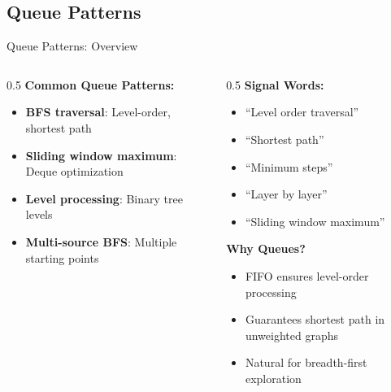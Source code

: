 \documentclass[aspectratio=169,xcolor=dvipsnames]{beamer}
\begin{document}
\subsection{Queue Patterns}

\begin{frame}{Queue Patterns: Overview}
  \begin{columns}
    \begin{column}{0.5\textwidth}
      \textbf{Common Queue Patterns:}
      \begin{itemize}
        \item \textbf{BFS traversal}: Level-order, shortest path
        \item \textbf{Sliding window maximum}: Deque optimization
        \item \textbf{Level processing}: Binary tree levels
        \item \textbf{Multi-source BFS}: Multiple starting points
      \end{itemize}
    \end{column}

    \begin{column}{0.5\textwidth}
      \textbf{Signal Words:}
      \begin{itemize}
        \item ``Level order traversal''
        \item ``Shortest path''
        \item ``Minimum steps''
        \item ``Layer by layer''
        \item ``Sliding window maximum''
      \end{itemize}

      \vspace{0.3cm}
      \textbf{Why Queues?}
      \begin{itemize}
        \item FIFO ensures level-order processing
        \item Guarantees shortest path in unweighted graphs
        \item Natural for breadth-first exploration
      \end{itemize}
    \end{column}
  \end{columns}
\end{frame}
\end{document}
